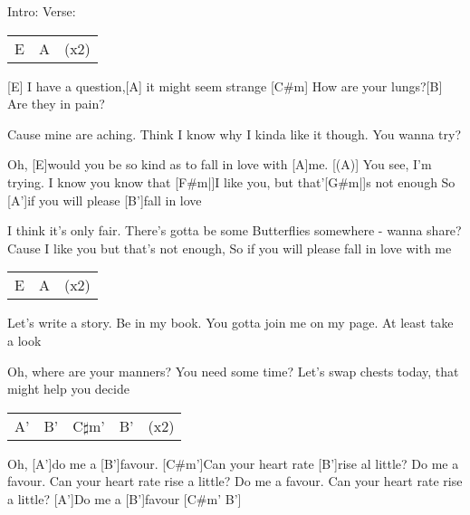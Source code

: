 
\chordscheme[%
	name = A',%
	position = 6,%
	barre = {1/1-6},%
	finger = {2/3, 3/4, 3/5}]
\chordscheme[%
	name = B',%
	position = 8,%
	barre = {1/1-6},%
	finger = {2/3, 3/4, 3/5}]
\chordscheme[%
	name = C$\sharp$m',%
	position = 10,%
	barre = {1/1-6},%
	finger = {3/4, 3/5}]


\begin{guitar}
	Intro: Verse:
	
	{\footnotesize\begin{tabular}{l|ll}
		E & A & (x2)
	\end{tabular}}
	
	[E] I have a question,[A] it might seem strange
	[C#m] How are your lungs?[B] Are they in pain?
	
	Cause mine are aching. Think I know why
	I kinda like it though. You wanna try?
	
	Oh, [E]would you be so kind as to fall in love with [A]me.
	[(A)] You see, I'm trying. I know you know that 
	[F#m|]{I }like you, but that'[G#m|]{s }not enough
	So [A']if you will please [B']fall in love
	
	I think it's only fair. There's gotta be some 
	Butterflies somewhere - wanna share?
	Cause I like you but that's not enough,
	So if you will please fall in love with me
	
	{\footnotesize\begin{tabular}{l|ll}
			E & A & (x2)
	\end{tabular}}
	
	Let's write a story. Be in my book.
	You gotta join me on my page. At least take a look
	
	Oh, where are your manners? You need some time?
	Let's swap chests today, that might help you decide
	
	 
	
	{\footnotesize\begin{tabular}{l|l|l|ll}
			A' & B' & C$\sharp$m' & B' & (x2)
	\end{tabular}}
	\pagebreak
	Oh, [A']do me a [B']favour. [C#m']Can your heart rate [B']rise al little?
	Do me a favour. Can your heart rate rise a little?
	Do me a favour. Can your heart rate rise a little?
	[A']Do me a [B']favour [C#m' B']{}
	

\end{guitar}

